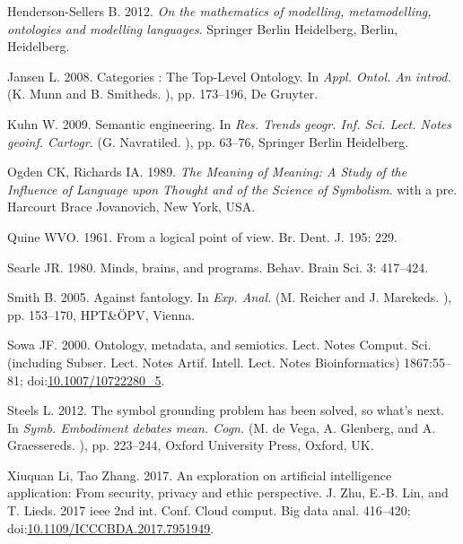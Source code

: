 \documentclass[a4paper,11pt,oneside,oldfontcommands]{memoir}
\theoremstyle{definition}
\theoremstyle{break}		%
\numberwithin{equation}{chapter}
\numberwithin{figure}{chapter}
\begin{document}
\leavevmode\hypertarget{ref-Henderson-Sellers2012}{}%
Henderson-Sellers B. 2012. \emph{On the mathematics of modelling,
metamodelling, ontologies and modelling languages}. Springer Berlin
Heidelberg, Berlin, Heidelberg.

\leavevmode\hypertarget{ref-Jansen2008}{}%
Jansen L. 2008. Categories : The Top-Level Ontology. In \emph{Appl.
Ontol. An introd.} (K. Munn and B. Smitheds. ), pp. 173--196, De
Gruyter.

\leavevmode\hypertarget{ref-Kuhn2009}{}%
Kuhn W. 2009. Semantic engineering. In \emph{Res. Trends geogr. Inf.
Sci. Lect. Notes geoinf. Cartogr.} (G. Navratiled. ), pp. 63--76,
Springer Berlin Heidelberg.

\leavevmode\hypertarget{ref-Ogden1989}{}%
Ogden CK, Richards IA. 1989. \emph{The Meaning of Meaning: A Study of
the Influence of Language upon Thought and of the Science of Symbolism}.
with a pre. Harcourt Brace Jovanovich, New York, USA.

\leavevmode\hypertarget{ref-Quine:1953er}{}%
Quine WVO. 1961. From a logical point of view. Br. Dent. J. 195: 229.

\leavevmode\hypertarget{ref-Searle:1980hw}{}%
Searle JR. 1980. Minds, brains, and programs. Behav. Brain Sci. 3:
417--424.

\leavevmode\hypertarget{ref-Smith2005}{}%
Smith B. 2005. Against fantology. In \emph{Exp. Anal.} (M. Reicher and
J. Marekeds. ), pp. 153--170, HPT\&ÖPV, Vienna.

\leavevmode\hypertarget{ref-Sowa:2000di}{}%
Sowa JF. 2000. Ontology, metadata, and semiotics. Lect. Notes Comput.
Sci. (including Subser. Lect. Notes Artif. Intell. Lect. Notes
Bioinformatics) 1867:55--81;
doi:\href{https://doi.org/10.1007/10722280_5}{10.1007/10722280\_5}.

\leavevmode\hypertarget{ref-Steels:2008tr}{}%
Steels L. 2012. The symbol grounding problem has been solved, so what's
next. In \emph{Symb. Embodiment debates mean. Cogn.} (M. de Vega, A.
Glenberg, and A. Graessereds. ), pp. 223--244, Oxford University Press,
Oxford, UK.

\leavevmode\hypertarget{ref-XiuquanLi2017}{}%
Xiuquan Li, Tao Zhang. 2017. An exploration on artificial intelligence
application: From security, privacy and ethic perspective. J. Zhu, E.-B.
Lin, and T. Lieds. 2017 ieee 2nd int. Conf. Cloud comput. Big data anal.
416--420;
doi:\href{https://doi.org/10.1109/ICCCBDA.2017.7951949}{10.1109/ICCCBDA.2017.7951949}.



\printindex

\end{document}
